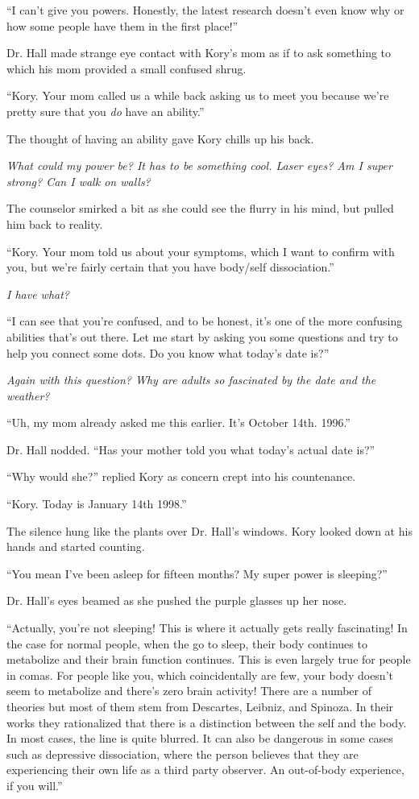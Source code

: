 \documentclass[9pt]{memoir}
\begin{document}
``I can't give you powers. Honestly, the latest research doesn't even know why or how some people have them in the first place!''

Dr. Hall made strange eye contact with Kory's mom as if to ask something to which his mom provided a small confused shrug.

``Kory. Your mom called us a while back asking us to meet you because we're pretty sure that you \textit{do} have an ability.''

The thought of having an ability gave Kory chills up his back.

\textit{What could my power be? It has to be something cool. Laser eyes? Am I super strong? Can I walk on walls?}

The counselor smirked a bit as she could see the flurry in his mind, but pulled him back to reality.

``Kory. Your mom told us about your symptoms, which I want to confirm with you, but we're fairly certain that you have body/self dissociation.''

\textit{I have what?}

``I can see that you're confused, and to be honest, it's one of the more confusing abilities that's out there. Let me start by asking you some questions and try to help you connect some dots. Do you know what today's date is?''

\textit{Again with this question? Why are adults so fascinated by the date and the weather?}

``Uh, my mom already asked me this earlier. It's October 14th. 1996.''

Dr. Hall nodded. ``Has your mother told you what today's actual date is?''

``Why would she?'' replied Kory as concern crept into his countenance.

``Kory. Today is January 14th 1998.''

The silence hung like the plants over Dr. Hall's windows. Kory looked down at his hands and started counting.

``You mean I've been asleep for fifteen months? My super power is sleeping?''

Dr. Hall's eyes beamed as she pushed the purple glasses up her nose.

``Actually, you're not sleeping! This is where it actually gets really fascinating! In the case for normal people, when the go to sleep, their body continues to metabolize and their brain function continues. This is even largely true for people in comas. For people like you, which coincidentally are few, your body doesn't seem to metabolize and there's zero brain activity! There are a number of theories but most of them stem from Descartes, Leibniz, and Spinoza. In their works they rationalized that there is a distinction between the self and the body. In most cases, the line is quite blurred. It can also be dangerous in some cases such as depressive dissociation, where the person believes that they are experiencing their own life as a third party observer. An out-of-body experience, if you will.''
\end{document}
